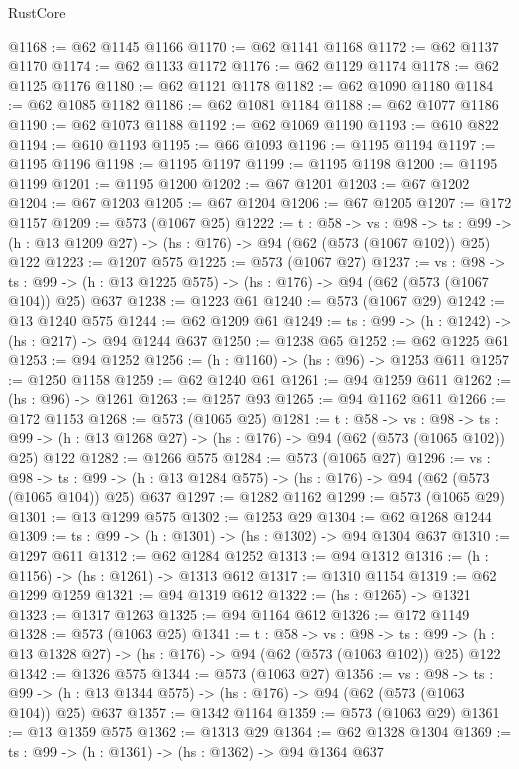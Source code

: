 \begin{lexlean}{RustCore}
\begin{coremodule}
@1168 := @62 @1145 @1166
@1170 := @62 @1141 @1168
@1172 := @62 @1137 @1170
@1174 := @62 @1133 @1172
@1176 := @62 @1129 @1174
@1178 := @62 @1125 @1176
@1180 := @62 @1121 @1178
@1182 := @62 @1090 @1180
@1184 := @62 @1085 @1182
@1186 := @62 @1081 @1184
@1188 := @62 @1077 @1186
@1190 := @62 @1073 @1188
@1192 := @62 @1069 @1190
@1193 := @610 @822
@1194 := @610 @1193
@1195 := @66 @1093
@1196 := @1195 @1194
@1197 := @1195 @1196
@1198 := @1195 @1197
@1199 := @1195 @1198
@1200 := @1195 @1199
@1201 := @1195 @1200
@1202 := @67 @1201
@1203 := @67 @1202
@1204 := @67 @1203
@1205 := @67 @1204
@1206 := @67 @1205
@1207 := @172 @1157
@1209 := @573 (@1067 @25)
@1222 := {t : @58} ->
  {vs : @98} ->
  {ts : @99} -> (h : @13 @1209 @27) -> (hs : @176) -> @94 (@62 (@573 (@1067 @102)) @25) @122
@1223 := @1207 @575
@1225 := @573 (@1067 @27)
@1237 := {vs : @98} ->
  {ts : @99} -> (h : @13 @1225 @575) -> (hs : @176) -> @94 (@62 (@573 (@1067 @104)) @25) @637
@1238 := @1223 @61
@1240 := @573 (@1067 @29)
@1242 := @13 @1240 @575
@1244 := @62 @1209 @61
@1249 := {ts : @99} -> (h : @1242) -> (hs : @217) -> @94 @1244 @637
@1250 := @1238 @65
@1252 := @62 @1225 @61
@1253 := @94 @1252
@1256 := (h : @1160) -> (hs : @96) -> @1253 @611
@1257 := @1250 @1158
@1259 := @62 @1240 @61
@1261 := @94 @1259 @611
@1262 := (hs : @96) -> @1261
@1263 := @1257 @93
@1265 := @94 @1162 @611
@1266 := @172 @1153
@1268 := @573 (@1065 @25)
@1281 := {t : @58} ->
  {vs : @98} ->
  {ts : @99} -> (h : @13 @1268 @27) -> (hs : @176) -> @94 (@62 (@573 (@1065 @102)) @25) @122
@1282 := @1266 @575
@1284 := @573 (@1065 @27)
@1296 := {vs : @98} ->
  {ts : @99} -> (h : @13 @1284 @575) -> (hs : @176) -> @94 (@62 (@573 (@1065 @104)) @25) @637
@1297 := @1282 @1162
@1299 := @573 (@1065 @29)
@1301 := @13 @1299 @575
@1302 := @1253 @29
@1304 := @62 @1268 @1244
@1309 := {ts : @99} -> (h : @1301) -> (hs : @1302) -> @94 @1304 @637
@1310 := @1297 @611
@1312 := @62 @1284 @1252
@1313 := @94 @1312
@1316 := (h : @1156) -> (hs : @1261) -> @1313 @612
@1317 := @1310 @1154
@1319 := @62 @1299 @1259
@1321 := @94 @1319 @612
@1322 := (hs : @1265) -> @1321
@1323 := @1317 @1263
@1325 := @94 @1164 @612
@1326 := @172 @1149
@1328 := @573 (@1063 @25)
@1341 := {t : @58} ->
  {vs : @98} ->
  {ts : @99} -> (h : @13 @1328 @27) -> (hs : @176) -> @94 (@62 (@573 (@1063 @102)) @25) @122
@1342 := @1326 @575
@1344 := @573 (@1063 @27)
@1356 := {vs : @98} ->
  {ts : @99} -> (h : @13 @1344 @575) -> (hs : @176) -> @94 (@62 (@573 (@1063 @104)) @25) @637
@1357 := @1342 @1164
@1359 := @573 (@1063 @29)
@1361 := @13 @1359 @575
@1362 := @1313 @29
@1364 := @62 @1328 @1304
@1369 := {ts : @99} -> (h : @1361) -> (hs : @1362) -> @94 @1364 @637

\end{coremodule}
\end{lexlean}
